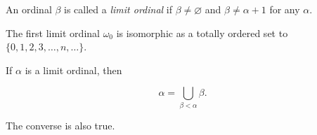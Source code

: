An ordinal $\beta$ is called a \textit{limit ordinal} if $\beta \neq \varnothing$ and $\beta \neq \alpha + 1$ for any $\alpha$.

The first limit ordinal $\omega_0$ is isomorphic as a totally ordered set to $\{0, 1, 2, 3, \ldots, n, \ldots\}$.

If $\alpha$ is a limit ordinal, then

$$\alpha = \bigcup_{\beta < \alpha} \beta.$$

The converse is also true.
